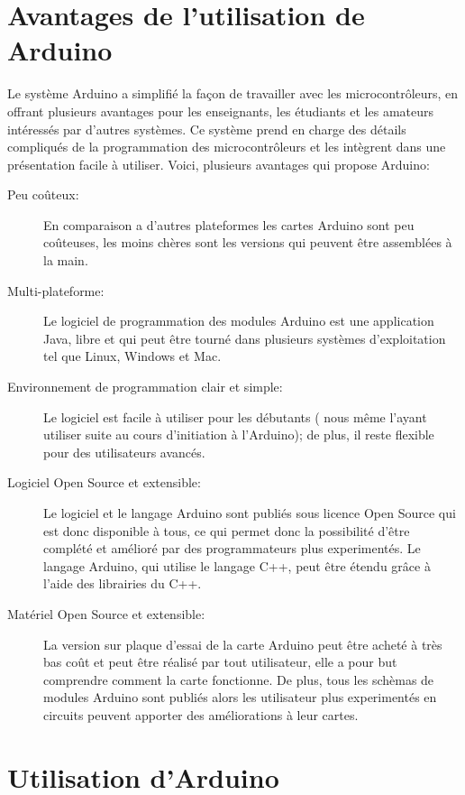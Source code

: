 \section{Avantages de l'utilisation de Arduino}

Le système Arduino a simplifié la façon de travailler avec les microcontrôleurs, en offrant plusieurs avantages pour les enseignants, les étudiants et 
les amateurs intéressés par d'autres systèmes. Ce système prend en charge des détails compliqués de la programmation des microcontrôleurs et les intègrent
dans une présentation facile à utiliser. Voici, plusieurs avantages qui propose Arduino:

\begin{description}
 \item[Peu coûteux:] En comparaison a d'autres plateformes les cartes Arduino sont peu coûteuses, les moins chères sont les versions qui peuvent être 
assemblées à la main.
 \item[Multi-plateforme:] Le logiciel de programmation des modules Arduino est une application Java, libre et qui peut être tourné dans plusieurs systèmes
d'exploitation tel que Linux, Windows et Mac.
 \item[Environnement de programmation clair et simple:] Le logiciel est facile à utiliser pour les débutants ( nous même l'ayant utiliser suite au cours
d'initiation à l'Arduino); de plus, il reste flexible pour des utilisateurs avancés.
 \item[Logiciel Open Source et extensible:] Le logiciel et le langage Arduino sont publiés sous licence Open Source qui est donc disponible à tous, ce qui 
permet donc la possibilité d'être complété et amélioré par des programmateurs plus experimentés. Le langage Arduino, qui utilise le langage C++, peut
être étendu grâce à l'aide des librairies du C++.
 \item[Matériel Open Source et extensible:] La version sur plaque d'essai de la carte Arduino peut être acheté à très bas coût et peut être réalisé par
tout utilisateur, elle a pour but comprendre comment la carte fonctionne. De plus, tous les schèmas de modules Arduino sont publiés alors les 
utilisateur plus experimentés en circuits peuvent apporter des améliorations à leur cartes.
\end{description}


\section{Utilisation d'Arduino}

